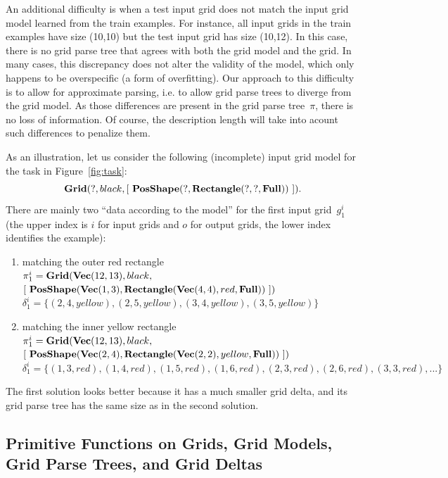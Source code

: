 \documentclass[a4paper]{llncs}
\begin{document}
An additional difficulty is when a test input grid does not match the
input grid model learned from the train examples. For instance, all
input grids in the train examples have size (10,10) but the test
input grid has size (10,12). In this case, there is no grid parse tree
that agrees with both the grid model and the grid. In many cases, this
discrepancy does not alter the validity of the model, which only
happens to be overspecific (a form of overfitting).
%
Our approach to this difficulty is to allow for approximate parsing,
i.e. to allow grid parse trees to diverge from the grid model. As
those differences are present in the grid parse tree~$\pi$, there is
no loss of information. Of course, the description length will take
into acount such differences to penalize them.

As an illustration, let us consider the following (incomplete) input
grid model for the task in Figure~\ref{fig:task}:
\[ {\bf Grid}(?, black, [\ {\bf PosShape}(?, {\bf Rectangle}(?,?,{\bf Full}))\ ]). \] There
are mainly two ``data according to the model'' for the first input
grid~$g^i_1$ (the upper index is $i$ for input grids and $o$ for
output grids, the lower index identifies the example):
\begin{enumerate}
\item matching the outer red rectangle\\
  $\pi^i_1 = {\bf Grid}({\bf Vec}(12,13), black,$\\
  \hspace*{2cm} $[\ {\bf PosShape}({\bf Vec}(1,3), {\bf Rectangle}({\bf Vec}(4,4), red, {\bf Full}))\ ])$\\
  $\delta^i_1 = \{ (2,4,yellow), (2,5,yellow), (3,4,yellow), (3,5,yellow) \}$

\item matching the inner yellow rectangle\\
  $\pi^i_1 = {\bf Grid}({\bf Vec}(12,13), black,$\\
  \hspace*{2cm} $[\ {\bf PosShape}({\bf Vec}(2,4), {\bf Rectangle}({\bf Vec}(2,2), yellow, {\bf Full}))\ ])$\\
  $\delta^i_1 = \{ (1,3,red), (1,4,red), (1,5,red), (1,6,red), (2,3,red), (2,6,red), (3,3,red), ...\}$
\end{enumerate}
The first solution looks better because it has a much smaller grid
delta, and its grid parse tree has the same size as in the second
solution.


\subsection{Primitive Functions on Grids, Grid Models, Grid Parse Trees, and Grid Deltas}
\label{primitive:functions}
\end{document}
